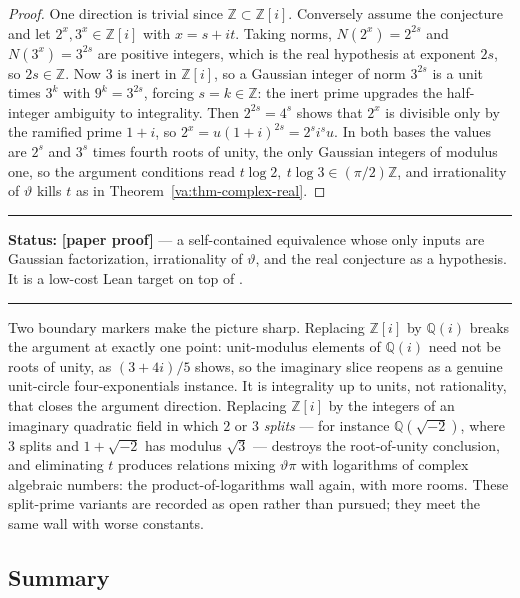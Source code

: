 \documentclass[11pt,oneside]{article}
\theoremstyle{definition}
\theoremstyle{remark}
\newcommand{\Z}{\mathbb Z}
\newcommand{\Q}{\mathbb Q}
\newcommand{\thetaq}{\vartheta}
\newcommand{\lean}[1]{\texttt{\detokenize{#1}}}
\newcommand{\statusnew}{\textcolor{newgreen}{\textbf{[paper proof]}}}
\newenvironment{statusbox}[1]
{\begin{center}\begin{minipage}{0.94\textwidth}\raggedright\hbadness=10000\hrule
\vspace{0.45em}\textbf{Status:} #1\par\vspace{0.35em}}
{\vspace{0.35em}\hrule\end{minipage}\end{center}}
\begin{document}
\begin{proof}
One direction is trivial since $\Z\subset\Z[i]$.  Conversely assume the conjecture and let
$2^x,3^x\in\Z[i]$ with $x=s+it$.  Taking norms, $N(2^x)=2^{2s}$ and $N(3^x)=3^{2s}$ are
positive integers, which is the real hypothesis at exponent $2s$, so $2s\in\Z$.  Now $3$ is
inert in $\Z[i]$, so a Gaussian integer of norm $3^{2s}$ is a unit times $3^{k}$ with
$9^{k}=3^{2s}$, forcing $s=k\in\Z$: the inert prime upgrades the half-integer ambiguity to
integrality.  Then $2^{2s}=4^{s}$ shows that $2^x$ is divisible only by the ramified prime
$1+i$, so $2^x=u(1+i)^{2s}=2^{s}i^{s}u$.  In both bases the values are $2^{s}$ and $3^{s}$
times fourth roots of unity, the only Gaussian integers of modulus one, so the argument
conditions read $t\log2,\ t\log3\in(\pi/2)\Z$, and irrationality of $\thetaq$ kills $t$ as in
Theorem~\ref{va:thm-complex-real}.
\end{proof}

\begin{statusbox}{\statusnew{} --- a self-contained equivalence whose only inputs are Gaussian
factorization, irrationality of $\thetaq$, and the real conjecture as a hypothesis.  It is a
low-cost Lean target on top of \lean{ComplexSolutions}.}
\end{statusbox}

Two boundary markers make the picture sharp.  Replacing $\Z[i]$ by $\Q(i)$ breaks the argument
at exactly one point: unit-modulus elements of $\Q(i)$ need not be roots of unity, as
$(3+4i)/5$ shows, so the imaginary slice reopens as a genuine unit-circle four-exponentials
instance.  It is integrality up to units, not rationality, that closes the argument direction.
Replacing $\Z[i]$ by the integers of an imaginary quadratic field in which $2$ or $3$
\emph{splits} --- for instance $\Q(\sqrt{-2})$, where $3$ splits and $1+\sqrt{-2}$ has modulus
$\sqrt3$ --- destroys the root-of-unity conclusion, and eliminating $t$ produces relations
mixing $\thetaq\pi$ with logarithms of complex algebraic numbers: the product-of-logarithms
wall again, with more rooms.  These split-prime variants are recorded as open rather than
pursued; they meet the same wall with worse constants.

\subsection{Summary}
\end{document}
